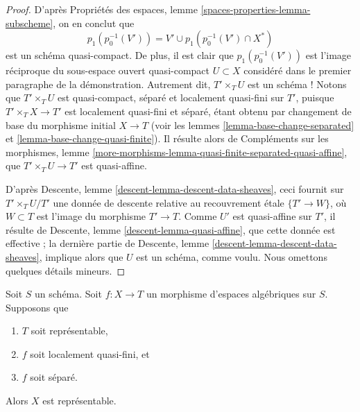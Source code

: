 \begin{proof}
\medskip\noindent
D'après
Propriétés des espaces, lemme \ref{spaces-properties-lemma-subscheme},
on en conclut que
$$
p_1(p_0^{-1}(V')) =
V' \cup p_1(p_0^{-1}(V') \cap X^*)
$$
est un schéma quasi-compact. De plus, il est clair que
$p_1(p_0^{-1}(V'))$ est l'image réciproque du
sous-espace ouvert quasi-compact $U \subset X$ considéré dans le
premier paragraphe de la démonstration. Autrement dit, $T' \times_T U$ est un schéma !
Notons que $T' \times_T U$ est quasi-compact,
séparé et localement quasi-fini sur $T'$, puisque
$T' \times_T X \to T'$ est localement quasi-fini et séparé,
étant obtenu par changement de base du morphisme initial $X \to T$ (voir les
lemmes \ref{lemma-base-change-separated} et
\ref{lemma-base-change-quasi-finite}).
Il résulte alors de
Compléments sur les morphismes,
lemme \ref{more-morphisms-lemma-quasi-finite-separated-quasi-affine},
que $T' \times_T U \to T'$ est quasi-affine.

\medskip\noindent
D'après
Descente, lemme \ref{descent-lemma-descent-data-sheaves},
ceci fournit sur $T' \times_T U / T'$ une donnée de descente
relative au recouvrement étale $\{T' \to W\}$, où $W \subset T$
est l'image du morphisme $T' \to T$.
Comme $U'$ est quasi-affine sur $T'$, il résulte de
Descente, lemme \ref{descent-lemma-quasi-affine},
que cette donnée est effective ; la dernière partie de
Descente, lemme \ref{descent-lemma-descent-data-sheaves},
implique alors que $U$ est un schéma, comme voulu.
Nous omettons quelques détails mineurs.
\end{proof}

\begin{proposition}
\label{proposition-locally-quasi-finite-separated-over-scheme}
Soit $S$ un schéma.
Soit $f : X \to T$ un morphisme d'espaces algébriques sur $S$.
Supposons que
\begin{enumerate}
\item $T$ soit représentable,
\item $f$ soit localement quasi-fini, et
\item $f$ soit séparé.
\end{enumerate}
Alors $X$ est représentable.
\end{proposition}

